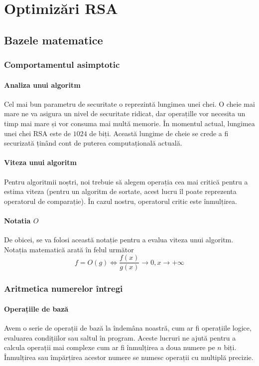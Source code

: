 \documentclass[12]{report}
\begin{document}
\tableofcontents
\chapter{Optimizări RSA}
 \section{Bazele matematice} 
    \subsection{Comportamentul asimptotic}
     \subsubsection{Analiza unui algoritm}
      Cel mai bun parametru de securitate o reprezintă lungimea unei chei. O cheie mai mare ne va
      asigura un nivel de securitate ridicat, dar operațille vor necesita un timp mai mare și vor consuma
      mai multă memorie. În momentul actual, lungimea unei chei RSA este de $1024$ de biți. Această lungime de 
      cheie se crede a fi securizată ținând cont de puterea computațională actuală.
     \subsubsection{Viteza unui algoritm}
      Pentru algoritmii noștri, noi trebuie să alegem operația cea mai critică pentru a estima viteza 
      (pentru un algoritm de sortate, acest lucru îl poate reprezenta operatorul de comparație). În cazul
      nostru, operatorul critic este înmulțirea. 
     \subsubsection{Notatia $O$}
      De obicei, se va folosi această notație pentru a evalua viteza unui algoritm. Notația matematică arată 
      în felul următor \\
      $$ f = O(g) \Leftrightarrow \frac{f(x)}{g(x)} \longrightarrow 0 , x\longrightarrow +\infty $$
      
     \subsection{Aritmetica numerelor întregi}
      \subsubsection{Operațiile de bază}
       Avem o serie de operații de bază la îndemâna noastră, cum ar fi operațiile logice, evaluarea condițiilor sau saltul în program. Aceste lucruri ne ajută pentru a calcula operații mai complexe cum ar fi înmulțirea a doua numere pe $n$ biți. Înmulțirea sau împărțirea acestor numere se numesc operații cu multiplă precizie. 
\end{document}
